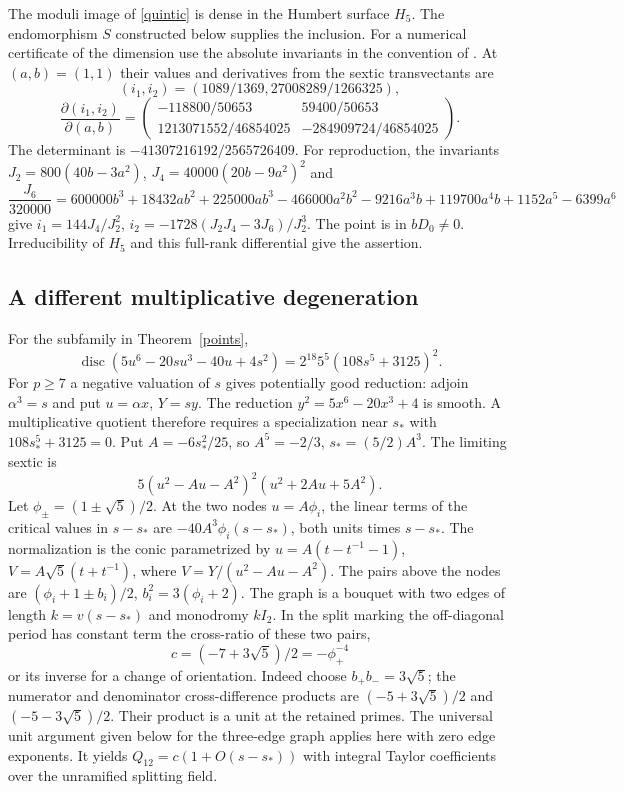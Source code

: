 \documentclass[11pt]{article}
\begin{document}
The moduli image of \eqref{quintic} is dense in the Humbert surface
$H_5$. The endomorphism $S$ constructed below supplies the inclusion.
For a numerical certificate of the dimension use the absolute
invariants in the convention of \cite{Shaska}. At $(a,b)=(1,1)$
their values and derivatives from the sextic transvectants are
\[
 (i_1,i_2)=(1089/1369,27008289/1266325),
\]
\[
 \frac{\partial(i_1,i_2)}{\partial(a,b)}=
 \begin{pmatrix}
 -118800/50653&59400/50653\\
 1213071552/46854025&-284909724/46854025
 \end{pmatrix}.
\]
The determinant is $-41307216192/2565726409$. For reproduction,
the invariants $J_2=800(40b-3a^2)$, $J_4=40000(20b-9a^2)^2$ and
\[
 \frac{J_6}{320000}=600000b^3+18432ab^2+225000ab^3-466000a^2b^2
                -9216a^3b+119700a^4b+1152a^5-6399a^6
\]
give $i_1=144J_4/J_2^2$,
$i_2=-1728(J_2J_4-3J_6)/J_2^3$. The point is in $bD_0\ne0$.
Irreducibility of $H_5$ and this full-rank differential give the
assertion.

\subsection{A different multiplicative degeneration}
For the subfamily in Theorem~\ref{points},
\[
 \operatorname{disc}(5u^6-20su^3-40u+4s^2)
 =2^{18}5^5(108s^5+3125)^2.
\]
For $p\ge7$ a negative valuation of $s$ gives potentially good
reduction: adjoin $\alpha^3=s$ and put $u=\alpha x$, $Y=sy$. The
reduction $y^2=5x^6-20x^3+4$ is smooth. A multiplicative quotient
therefore requires a specialization near $s_*$ with
$108s_*^5+3125=0$. Put $A=-6s_*^2/25$, so $A^5=-2/3$,
$s_*=(5/2)A^3$. The limiting sextic is
\[
 5(u^2-Au-A^2)^2(u^2+2Au+5A^2).
\]
Let $\phi_\pm=(1\pm\sqrt5)/2$. At the two nodes $u=A\phi_i$,
the linear terms of the critical values in $s-s_*$ are
$-40A^3\phi_i(s-s_*)$, both units times $s-s_*$. The normalization
is the conic parametrized by
$u=A(t-t^{-1}-1)$, $V=A\sqrt5(t+t^{-1})$, where
$V=Y/(u^2-Au-A^2)$. The pairs above the nodes are
$(\phi_i+1\pm b_i)/2$, $b_i^2=3(\phi_i+2)$.
The graph is a bouquet with two edges of length $k=v(s-s_*)$ and
monodromy $kI_2$. In the split marking the off-diagonal period has
constant term the cross-ratio of these two pairs,
\[
 c=(-7+3\sqrt5)/2=-\phi_+^{-4}
\]
or its inverse for a change of orientation. Indeed choose
$b_+b_-=3\sqrt5$; the numerator and denominator cross-difference
products are $(-5+3\sqrt5)/2$ and $(-5-3\sqrt5)/2$.
Their product is a unit at the retained primes. The universal
unit argument given below for the three-edge graph applies here
with zero edge exponents. It yields $Q_{12}=c(1+O(s-s_*))$
with integral Taylor coefficients over the unramified splitting field.
\end{document}
